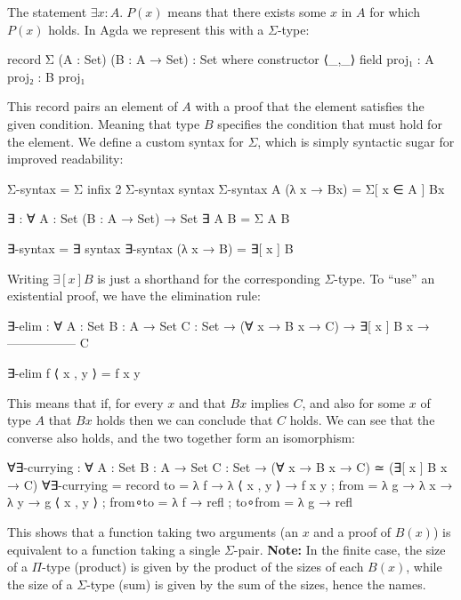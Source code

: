 \documentclass{lecturenotes}
\begin{document}
The statement $\exists x : A.\; P(x)$ means that there exists some $x$ in $A$ for which $P(x)$ holds. In Agda we represent this with a $\Sigma$-type:
\begin{code}
record Σ (A : Set) (B : A → Set) : Set where
  constructor ⟨_,_⟩
  field
    proj₁ : A
    proj₂ : B proj₁
\end{code}
This record pairs an element of $A$ with a proof that the element satisfies the given condition. 
Meaning that type $B$ specifies the condition that must hold for the element.
\newline \newline
We define a custom syntax for $\Sigma$, which is simply syntactic sugar for improved readability:
\begin{code}
Σ-syntax = Σ
infix 2 Σ-syntax
syntax Σ-syntax A (λ x → Bx) = Σ[ x ∈ A ] Bx

∃ : ∀ {A : Set} (B : A → Set) → Set
∃ {A} B = Σ A B

∃-syntax = ∃
syntax ∃-syntax (λ x → B) = ∃[ x ] B
\end{code}
Writing $\exists[ x ] B$ is just a shorthand for the corresponding $\Sigma$-type.
\newline \newline
To “use” an existential proof, we have the elimination rule:
\begin{code}
∃-elim : ∀ {A : Set} {B : A → Set} {C : Set} →
  (∀ x → B x → C) →
    ∃[ x ] B x →
  -----------------
        C

∃-elim f ⟨ x , y ⟩ = f x y
\end{code}
This means that if, for every $x$ and that $B x$ implies $C$, 
and also for some $x$ of type $A$ that $B x$ holds then we can conclude that $C$ holds.
\newline 
We can see that the converse also holds, and the two together form an isomorphism:
\begin{code}
∀∃-currying : ∀ {A : Set} {B : A → Set} {C : Set}
  → (∀ x → B x → C) ≃ (∃[ x ] B x → C)
∀∃-currying =
  record
  {
     to      = λ {f → λ { ⟨ x , y ⟩ → f x y } }
   ; from    = λ {g → λ x → λ y → g ⟨ x , y ⟩ }
   ; from∘to = λ f → refl
   ; to∘from = λ g → refl
   }
\end{code}
This shows that a function taking two arguments (an $x$ and a proof of $B(x)$) is equivalent to a function taking a single $\Sigma$-pair.
\textbf{Note:} In the finite case, the size of a $\Pi$-type (product) is given by the product of the sizes of each $B(x)$, 
while the size of a $\Sigma$-type (sum) is given by the sum of the sizes, hence the names.
\end{document}
